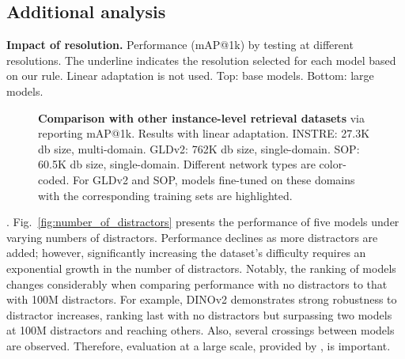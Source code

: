 \subsection{Additional analysis}
\label{sec:addan}

\begin{table}[t]
  \centering
  \vspace{-5pt}
  \scalebox{0.92}{
  }
  \vspace{-7pt}
  \caption{\textbf{Impact of resolution.} Performance (mAP@1k) by testing at different resolutions. The underline indicates the resolution selected for each model based on our rule. Linear adaptation is not used. Top: base models. Bottom: large models.
  \label{tab:resolution}
  \vspace{-13pt}
  }
\end{table}

\begin{figure*}[t]
  \centering
  \vspace{-15pt}
  \scalebox{0.9}{
    \hspace{10pt}
    
    \hspace{10pt}
     
    \hspace{10pt}
     
  }
  \vspace{-10pt}
  \caption{\textbf{Comparison with other instance-level retrieval datasets} via reporting mAP@1k. Results with linear adaptation. INSTRE: 27.3K db size, multi-domain. GLDv2: 762K db size, single-domain. SOP:  60.5K db size, single-domain. Different network types are color-coded. For GLDv2 and SOP, models fine-tuned on these domains with the corresponding training sets are highlighted.
  \label{fig:instre_gld_sop_adapt}
  \vspace{-15pt}
  }
\end{figure*}

.
Fig.~\ref{fig:number_of_distractors} presents the performance of five models under varying numbers of distractors. Performance declines as more distractors are added; however, significantly increasing the dataset's difficulty requires an exponential growth in the number of distractors. Notably, the ranking of models changes considerably when comparing performance with no distractors to that with 100M distractors. For example, DINOv2 demonstrates strong robustness to distractor increases, ranking last with no distractors but surpassing two models at 100M distractors and reaching others. Also, several crossings between models are observed. Therefore, evaluation at a large scale, provided by \ours, is important.

